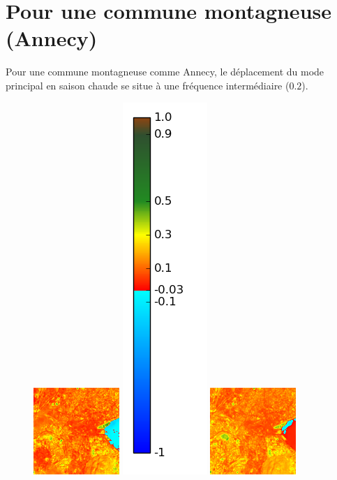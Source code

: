 \documentclass{book}
\begin{document}
\clearpage

\section{Pour une commune montagneuse (Annecy)}

Pour une commune montagneuse comme Annecy, le déplacement du mode principal en saison chaude se situe à une fréquence intermédiaire ($0.2$).

\begin{figure}[H]
\centerline{
\includegraphics[scale=0.7]{images/Annecy/03_ndvi.png}
\includegraphics[scale=0.2]{images/colormap.png}
\includegraphics[scale=0.7]{images/Annecy/04_ndvi.png}
}
\end{figure}
\end{document}
